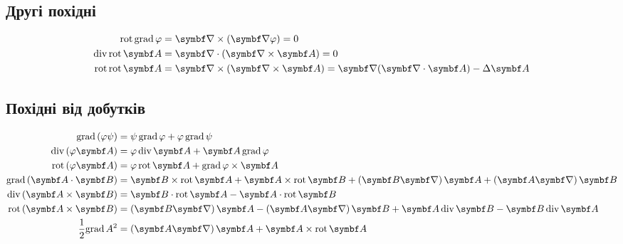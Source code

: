\subsection{Другі похідні}\hypertarget{vector-second-derivatives}{}

\begin{align}
	\mathrm{rot}\,\mathrm{grad}\,\phi    & = \rot(\vect{\nabla}\phi)  = 0                                             \\
	\mathrm{div}\,\mathrm{rot}\,\vect{A} & = \divg(\rot\vect{A})  = 0                                                 \\
	\mathrm{rot}\,\mathrm{rot}\,\vect{A} & = \rot(\rot\vect{A})  = \vect{\nabla}(\divg\vect{A}) - \Laplasian \vect{A}
\end{align}

\subsection{Похідні від добутків}\hypertarget{vector-product-derivatives}{}

\begin{align}
	\mathrm{grad}\,(\phi \psi)             & = \psi\,\mathrm{grad}\,\phi +\phi\, \mathrm{grad}\,\psi                                                                                                                           \\
	\mathrm{div}\,(\phi \vect{A})          & = \phi\,\mathrm{div}\,\vect{A} + \vect{A}\,\mathrm{grad}\,\phi                                                                                                                    \\
	\mathrm{rot}\,(\phi \vect{A})          & = \phi\,\mathrm{rot}\,\vect{A} + \mathrm{grad}\,\phi \times \vect{A}                                                                                                              \\
	\mathrm{grad}\,(\vect{A}\cdot\Bfield) & = \Bfield\times\mathrm{rot}\,\vect{A} + \vect{A}\times\mathrm{rot}\,\Bfield + \left( \Bfield\vect{\nabla}\right)\vect{A} + \left( \vect{A}\vect{\nabla}\right)\Bfield         \\
	\mathrm{div}\,(\vect{A}\times\Bfield) & = \Bfield\cdot\mathrm{rot}\,\vect{A} - \vect{A}\cdot\mathrm{rot}\,\Bfield                                                                                                       \\
	\mathrm{rot}\,(\vect{A}\times\Bfield) & = \left( \Bfield\vect{\nabla}\right)\vect{A} - \left( \vect{A}\vect{\nabla}\right)\Bfield + 	\vect{A}\,\mathrm{div}\,\Bfield - \Bfield\,\mathrm{div}\,\vect{A} \label{rotvect} \\
	\frac12\mathrm{grad}\,A^2              & =  \left( \vect{A}\vect{\nabla}\right)\vect{A} + \vect{A}\times\mathrm{rot}\,\vect{A}
\end{align}



